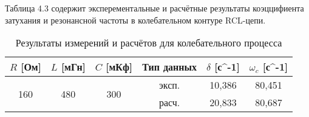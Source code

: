 Таблица 4.3 содержит эксперементальные и расчётные результаты коэццифиента затухания и резонансной частоты в колебательном контуре RCL-цепи.

\begin{table}[h]
	\centering
	\begin{tabular}{|c|c|c|c|c|c|}
		\hline
		$R$ [Ом]             & $L$ [мГн]            & $C$ [мКф]            & Тип данных & $\delta$ [с^{-1}] & $\omega_c$ [с^{-1}] \\
		\hline
		\multirow{2}{*}{160} & \multirow{2}{*}{480} & \multirow{2}{*}{300} & эксп.      & 10,386            & 80,451              \\
		\cline{4-6}
		                     &                      &                      & расч.      & 20,833            & 80,687              \\ \hline
	\end{tabular}
	\caption{Результаты измерений и расчётов для колебательного процесса}
\end{table}
